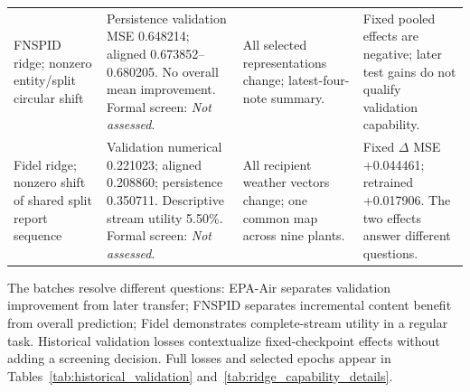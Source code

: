 \begin{table}[!ht]
\begin{tabular}{@{}>{\raggedright\arraybackslash}p{}>{\raggedright\arraybackslash}p{}>{\raggedright\arraybackslash}p{}>{\raggedright\arraybackslash}p{}@{}}
FNSPID ridge; nonzero entity/split circular shift & Persistence validation MSE 0.648214; aligned 0.673852--0.680205. No overall mean improvement. Formal screen: \emph{Not assessed}. & All selected representations change; latest-four-note summary. & Fixed pooled effects are negative; later test gains do not qualify validation capability.\\
Fidel ridge; nonzero shift of shared split report sequence & Validation numerical 0.221023; aligned 0.208860; persistence 0.350711. Descriptive stream utility 5.50\%. Formal screen: \emph{Not assessed}. & All recipient weather vectors change; one common map across nine plants. & Fixed $\Delta$ MSE +0.044461; retrained +0.017906. The two effects answer different questions.\\
\bottomrule
\end{tabular}
\end{table}

The batches resolve different questions: EPA-Air separates validation improvement from later transfer; FNSPID separates incremental content benefit from overall prediction; Fidel demonstrates complete-stream utility in a regular task. Historical validation losses contextualize fixed-checkpoint effects without adding a screening decision. Full losses and selected epochs appear in Tables~\ref{tab:historical_validation} and~\ref{tab:ridge_capability_details}.
